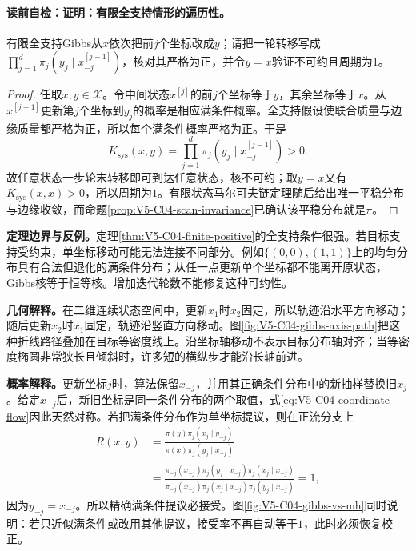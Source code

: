 \paragraph{读前自检：证明：有限全支持情形的遍历性。}有限全支持Gibbs从$x$依次把前$j$个坐标改成$y$；请把一轮转移写成$\prod_{j=1}^d\pi_j(y_j\mid x_{-j}^{[j-1]})$，核对其严格为正，并令$y=x$验证不可约且周期为1。\par

\begin{proof}
任取$x,y\in\mathcal X$。令中间状态$x^{[j]}$的前$j$个坐标等于$y$，其余坐标等于$x$。从$x^{[j-1]}$更新第$j$个坐标到$y_j$的概率是相应满条件概率。全支持假设使联合质量与边缘质量都严格为正，所以每个满条件概率严格为正。于是
\[
K_{\mathrm{sys}}(x,y)
=\prod_{j=1}^d
\pi_j\!\left(y_j\mid x^{[j-1]}_{-j}\right)>0.
\]
故任意状态一步轮末转移即可到达任意状态，核不可约；取$y=x$又有$K_{\mathrm{sys}}(x,x)>0$，所以周期为$1$。有限状态马尔可夫链定理随后给出唯一平稳分布与边缘收敛，而命题\ref{prop:V5-C04-scan-invariance}已确认该平稳分布就是$\pi$。
\end{proof}

\begin{warningbox}
\textbf{定理边界与反例。}定理\ref{thm:V5-C04-finite-positive}的全支持条件很强。若目标支持受约束，单坐标移动可能无法连接不同部分。例如$\{(0,0),(1,1)\}$上的均匀分布具有合法但退化的满条件分布；从任一点更新单个坐标都不能离开原状态，Gibbs核等于恒等核。增加迭代轮数不能修复这种可约性。
\end{warningbox}

\label{struct:V5-C04-CH14}
\textbf{几何解释。}在二维连续状态空间中，更新$x_1$时$x_2$固定，所以轨迹沿水平方向移动；随后更新$x_2$时$x_1$固定，轨迹沿竖直方向移动。图\ref{fig:V5-C04-gibbs-axis-path}把这种折线路径叠加在目标等密度线上。沿坐标轴移动不表示目标分布轴对齐；当等密度椭圆非常狭长且倾斜时，许多短的横纵步才能沿长轴前进。


\label{struct:V5-C04-CH15}
\textbf{概率解释。}更新坐标$j$时，算法保留$x_{-j}$，并用其正确条件分布中的新抽样替换旧$x_j$。给定$x_{-j}$后，新旧坐标是同一条件分布的两个取值，式\eqref{eq:V5-C04-coordinate-flow}因此天然对称。若把满条件分布作为单坐标\mbox{\MetropolisHastings{}}提议，则在正流分支上
\begin{align}
R(x,y)
&=\frac{\pi(y)\pi_j(x_j\mid y_{-j})}
        {\pi(x)\pi_j(y_j\mid x_{-j})}\\
&=\frac{\pi_{-j}(x_{-j})\pi_j(y_j\mid x_{-j})
          \pi_j(x_j\mid x_{-j})}
        {\pi_{-j}(x_{-j})\pi_j(x_j\mid x_{-j})
          \pi_j(y_j\mid x_{-j})}=1,
\end{align}
因为$y_{-j}=x_{-j}$。所以精确满条件提议必接受。图\ref{fig:V5-C04-gibbs-vs-mh}同时说明：若只近似满条件或改用其他提议，接受率不再自动等于$1$，此时必须恢复\MetropolisHastings{}校正。


